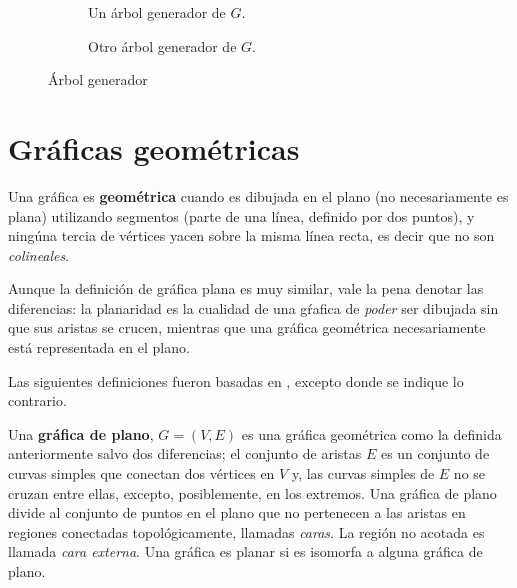 \begin{figure}
\centering
  \begin{subfigure}{0.4\textwidth}
    \caption{Un \'arbol generador de $G$.}\label{fig:graph}
  \end{subfigure}
  \begin{subfigure}{0.4\textwidth}
    \caption{Otro \'arbol generador de $G$.}
  \end{subfigure}
  \caption{\'Arbol generador}
\end{figure}

\section{Gr\'aficas geom\'etricas}

\begin{definition}
Una gr\'afica es \textbf{geom\'etrica} cuando es dibujada en el plano (no necesariamente es plana) utilizando segmentos (parte de una l\'inea, definido por dos puntos), y ning\'una tercia de v\'ertices yacen sobre la misma l\'inea recta, es decir que no son \emph{colineales}. \cite{handbook}
\end{definition}

Aunque la definición de gráfica plana es muy similar, vale la pena denotar las diferencias: la planaridad es la cualidad de una gŕafica de \textit{poder} ser dibujada sin que sus aristas se crucen, mientras que una gráfica geométrica necesariamente está representada en el plano.

Las siguientes definiciones fueron basadas en \cite{tamassia}, excepto donde se indique lo contrario.

\begin{definition}
Una \textbf{gr\'afica de plano}, $G=(V, E)$ es una gr\'afica geom\'etrica como la definida anteriormente salvo dos diferencias; el conjunto de aristas $E$ es un conjunto de curvas simples que conectan dos v\'ertices en $V$ y, las curvas simples de $E$ no se cruzan entre ellas, excepto, posiblemente, en los extremos. Una gr\'afica de plano divide al conjunto de puntos en el plano que no pertenecen a las aristas en regiones conectadas topológicamente, llamadas \emph{caras}. La región no acotada es llamada \emph{cara externa}. Una gr\'afica es planar si es isomorfa a alguna gr\'afica de plano.
\end{definition}

